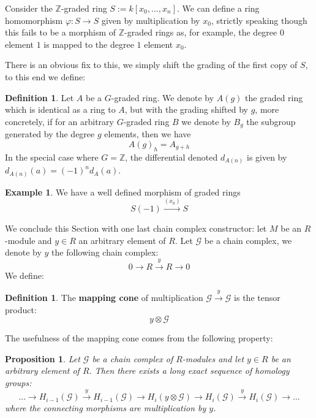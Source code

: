 \documentclass[12pt]{article}
\theoremstyle{plain}
\newtheorem{proposition}[thm]{Proposition}
\theoremstyle{definition}
\newtheorem{defn}[thm]{Definition} %
\newtheorem{example}[thm]{Example}
\newcommand{\bb}[1]{\mathbb{#1}}
\newcommand{\scr}[1]{\mathscr{#1}}
\newcommand{\lto}{\longrightarrow}
\begin{document}
Consider the $\bb{Z}$-graded ring $S := k[x_0,...,x_n]$. We can define a ring homomorphism $\varphi: S \lto S$ given by multiplication by $x_0$, strictly speaking though this fails to be a morphism of $\bb{Z}$-graded rings as, for example, the degree $0$ element $1$ is mapped to the degree $1$ element $x_0$.

There is an obvious fix to this, we simply shift the grading of the first copy of $S$, to this end we define:
\begin{defn}
Let $A$ be a $G$-graded ring. We denote by $A(g)$ the graded ring which is identical as a ring to $A$, but with the grading shifted by $g$, more concretely, if for an arbitrary $G$-graded ring $B$ we denote by $B_g$ the subgroup generated by the degree $g$ elements, then we have
\begin{equation}
A(g)_h = A_{g + h}
\end{equation}
In the special case where $G = \bb{Z}$, the differential denoted $d_{A(n)}$ is given by $d_{A(n)}(a) = (-1)^nd_A(a)$.
\end{defn}
\begin{example}
We have a well defined morphism of graded rings
\begin{equation}
S(-1) \stackrel{(x_0)}{\lto}S
\end{equation}
\end{example}
We conclude this Section with one last chain complex constructor: let $M$ be an $R$-module and $y \in R$ an arbitrary element of $R$.  Let $\scr{G}$ be a chain complex, we denote by $y$ the following chain complex:
\begin{equation}
0 \lto R \stackrel{y}{\lto} R \lto 0
\end{equation}
We define:
\begin{defn}
The \textbf{mapping cone} of multiplication $\scr{G} \stackrel{y}{\lto} \scr{G}$ is the tensor product:
\begin{equation}
y \otimes \scr{G}
\end{equation}
\end{defn}
The usefulness of the mapping cone comes from the following property:
\begin{proposition}
Let $\scr{G}$ be a chain complex of $R$-modules and let $y\in R$ be an arbitrary element of $R$. Then there exists a long exact sequence of homology groups:
\begin{equation}\label{eq:mapping_exact_sequence}
\hdots \lto H_{i-1}(\scr{G}) \stackrel{y}{\lto} H_{i-1}(\scr{G}) \lto H_{i}(y \otimes \scr{G})\lto H_i(\scr{G}) \stackrel{y}{\lto} H_{i}(\scr{G}) \lto \hdots
\end{equation}
where the connecting morphisms are multiplication by $y$.
\end{proposition}
\end{document}
